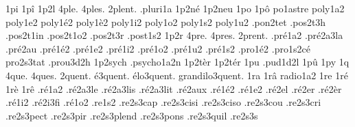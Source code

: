 {%
1pi
1pî
1p2l
4ple.
4ples.
2plent. %
                    .pluri1a
                    1p2né
                    1p2neu
1po
1pô
                    po1astre
                    poly1a2
                    poly1e2
                    poly1é2
                    poly1è2
                    poly1i2
                    poly1o2
                    poly1s2
                    poly1u2
                    .pon2tet %
                    .pos2t3h
                    .pos2t1in
                    .pos2t1o2
                    .pos2t3r
                    .post1s2
1p2r
4pre.
4pres.
2prent. %
                    .pré1a2
                    .pré2a3la %
                    .pré2au
                    .pré1é2
                    .pré1e2
                    .pré1i2
                    .pré1o2
                    .pré1u2
                    .pré1s2
                    .pro1é2
                    .pro1s2cé
                    pro2s3tat
                    .prou3d2h
                    1p2sych
                    .psycho1a2n
                    1p2tèr
                    1p2tér
1pu
                    .pud1d2l
1pû
1py
1q
4que.
4ques.
        2quent.
     é3quent.
   élo3quent.
grandilo3quent.
1ra
1râ
                    radio1a2 %
1re
1ré
1rè
1rê
                    .ré1a2
                    .ré2a3le
                    .ré2a3lis
                    .ré2a3lit
                    .ré2aux
                    .ré1é2
                    .ré1e2
                    .ré2el
                    .ré2er
                    .ré2èr
                    .ré1i2
                    .ré2i3fi
                    .ré1o2
                    .re1s2
                    .re2s3cap
                    .re2s3cisi %
                    .re2s3ciso %
                    .re2s3cou
                    .re2s3cri
                    .re2s3pect
                    .re2s3pir
                    .re2s3plend
                    .re2s3pons
                    .re2s3quil
                    .re2s3s
}
